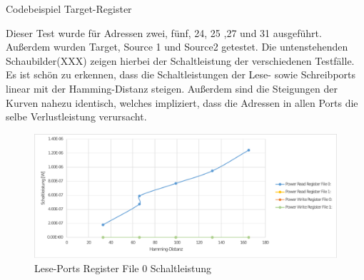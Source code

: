 \begin{algorithm}[H]
	\begin{algorithmic}[1]
		\caption{Codebeispiel Target-Register }
		\label{code:target_switching_test}
	\end{algorithmic}
\end{algorithm}

Dieser Test wurde für Adressen zwei, fünf, 24, 25 ,27 und 31 ausgeführt. Außerdem wurden Target, Source 1 und Source2 getestet. Die untenstehenden Schaubilder(XXX) zeigen hierbei der Schaltleistung der verschiedenen Testfälle. Es ist schön zu erkennen, dass die Schaltleistungen der Lese- sowie Schreibports linear mit der Hamming-Distanz steigen. Außerdem sind die Steigungen der Kurven nahezu identisch, welches impliziert, dass die Adressen in allen Ports die selbe Verlustleistung verursacht.

%	

\begin{figure}[htbp] 
	\centering
	\includegraphics[width=\textwidth]{fig/source1_power.pdf}
	\caption{Lese-Ports Register File 0 Schaltleistung }
	\label{fig:source1_power}
\end{figure}

